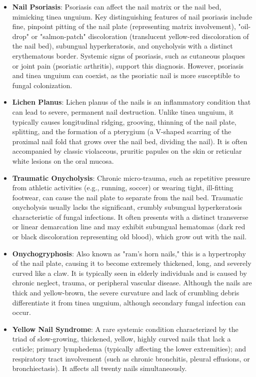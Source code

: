 \begin{itemize}
    \item \textbf{Nail Psoriasis}: Psoriasis can affect the nail matrix or the nail bed, mimicking tinea unguium. Key distinguishing features of nail psoriasis include fine, pinpoint pitting of the nail plate (representing matrix involvement), "oil-drop" or "salmon-patch" discoloration (translucent yellow-red discoloration of the nail bed), subungual hyperkeratosis, and onycholysis with a distinct erythematous border. Systemic signs of psoriasis, such as cutaneous plaques or joint pain (psoriatic arthritis), support this diagnosis. However, psoriasis and tinea unguium can coexist, as the psoriatic nail is more susceptible to fungal colonization.
    \item \textbf{Lichen Planus}: Lichen planus of the nails is an inflammatory condition that can lead to severe, permanent nail destruction. Unlike tinea unguium, it typically causes longitudinal ridging, grooving, thinning of the nail plate, splitting, and the formation of a pterygium (a V-shaped scarring of the proximal nail fold that grows over the nail bed, dividing the nail). It is often accompanied by classic violaceous, pruritic papules on the skin or reticular white lesions on the oral mucosa.
    \item \textbf{Traumatic Onycholysis}: Chronic micro-trauma, such as repetitive pressure from athletic activities (e.g., running, soccer) or wearing tight, ill-fitting footwear, can cause the nail plate to separate from the nail bed. Traumatic onycholysis usually lacks the significant, crumbly subungual hyperkeratosis characteristic of fungal infections. It often presents with a distinct transverse or linear demarcation line and may exhibit subungual hematomas (dark red or black discoloration representing old blood), which grow out with the nail.
    \item \textbf{Onychogryphosis}: Also known as "ram's horn nails," this is a hypertrophy of the nail plate, causing it to become extremely thickened, long, and severely curved like a claw. It is typically seen in elderly individuals and is caused by chronic neglect, trauma, or peripheral vascular disease. Although the nails are thick and yellow-brown, the severe curvature and lack of crumbling debris differentiate it from tinea unguium, although secondary fungal infection can occur.
    \item \textbf{Yellow Nail Syndrome}: A rare systemic condition characterized by the triad of slow-growing, thickened, yellow, highly curved nails that lack a cuticle; primary lymphedema (typically affecting the lower extremities); and respiratory tract involvement (such as chronic bronchitis, pleural effusions, or bronchiectasis). It affects all twenty nails simultaneously.

\end{itemize}
